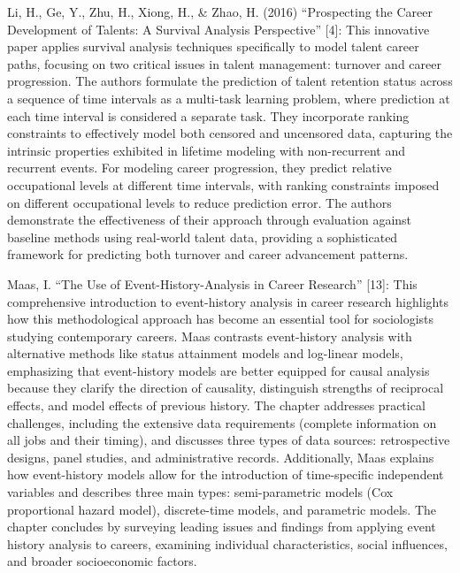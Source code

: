 \documentclass[./main.tex]{subfiles}
\begin{document}
Li, H., Ge, Y., Zhu, H., Xiong, H., \& Zhao, H. (2016) ``Prospecting the
Career Development of Talents: A Survival Analysis Perspective''
{[}4{]}: This innovative paper applies survival analysis techniques
specifically to model talent career paths, focusing on two critical
issues in talent management: turnover and career progression. The
authors formulate the prediction of talent retention status across a
sequence of time intervals as a multi-task learning problem, where
prediction at each time interval is considered a separate task. They
incorporate ranking constraints to effectively model both censored and
uncensored data, capturing the intrinsic properties exhibited in
lifetime modeling with non-recurrent and recurrent events. For modeling
career progression, they predict relative occupational levels at
different time intervals, with ranking constraints imposed on different
occupational levels to reduce prediction error. The authors demonstrate
the effectiveness of their approach through evaluation against baseline
methods using real-world talent data, providing a sophisticated
framework for predicting both turnover and career advancement patterns.

Maas, I. ``The Use of Event-History-Analysis in Career Research''
{[}13{]}: This comprehensive introduction to event-history analysis in
career research highlights how this methodological approach has become
an essential tool for sociologists studying contemporary careers. Maas
contrasts event-history analysis with alternative methods like status
attainment models and log-linear models, emphasizing that event-history
models are better equipped for causal analysis because they clarify the
direction of causality, distinguish strengths of reciprocal effects, and
model effects of previous history. The chapter addresses practical
challenges, including the extensive data requirements (complete
information on all jobs and their timing), and discusses three types of
data sources: retrospective designs, panel studies, and administrative
records. Additionally, Maas explains how event-history models allow for
the introduction of time-specific independent variables and describes
three main types: semi-parametric models (Cox proportional hazard
model), discrete-time models, and parametric models. The chapter
concludes by surveying leading issues and findings from applying event
history analysis to careers, examining individual characteristics,
social influences, and broader socioeconomic factors.
\end{document}
